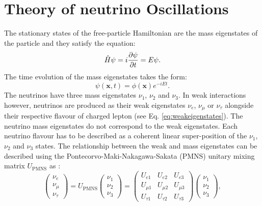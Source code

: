 \section{Theory of neutrino Oscillations}
\label{Sec:OscillationTheory}
The stationary states of the free-particle Hamiltonian are the mass eigenstates of the particle and they satisfy the equation:
\begin{equation}
\label{eq:Schroedinger1}
    \Hat{H}\psi = i\frac{\partial\psi}{\partial t} =E\psi .
\end{equation}
The time evolution of the mass eigenstates takes the form:
\begin{equation}
    \psi(\mathbf{x},t)=\phi(\mathbf{x})e^{-iEt} .
\end{equation}
The neutrinos have three mass eigenstates $\nu_1$, $\nu_2$ and $\nu_3$. In weak interactions however, neutrinos are produced as their weak eigenstates $\nu_e$, $\nu_\mu$ or $\nu_\tau$ alongside their respective flavour of charged lepton (see Eq. \ref{eq:weakeigenstates}). The neutrino mass eigenstates do not correspond to the weak eigenstates. Each neutrino flavour has to be described as a coherent linear super-position of the $\nu_1$, $\nu_2$ and $\nu_3$ states. The relationship between the weak and mass eigenstates can be described using the Pontecorvo-Maki-Nakagawa-Sakata (PMNS) unitary mixing matrix $U_\text{PMNS}$ as \cite{Thomson_2013}:
\begin{equation}
\label{eq:PMNS1}
    \begin{pmatrix}
        \nu_e \\ \nu_\mu \\ \nu_\tau
    \end{pmatrix}
    = U_\text{PMNS}
    \begin{pmatrix}
        \nu_1 \\ \nu_2 \\ \nu_3
    \end{pmatrix}   
    =
    \begin{pmatrix}
        U_{e1} & U_{e2} & U_{e3} \\
        U_{\mu 1} & U_{\mu 2} & U_{\mu 3} \\
        U_{\tau 1} & U_{\tau 2} & U_{\tau 3} 
    \end{pmatrix}
    \begin{pmatrix}
        \nu_1 \\ \nu_2 \\ \nu_3
    \end{pmatrix} ,
\end{equation}

